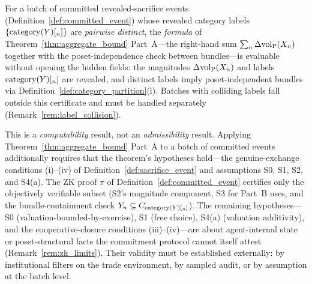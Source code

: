 \begin{proposition}
\label{prop:commit_preserves}
For a batch of committed revealed-sacrifice events
(Definition~\ref{def:committed_event}) whose revealed category
labels $\{\mathrm{category}(Y)[_n]\}$ are \emph{pairwise distinct}, the
\emph{formula} of Theorem~\ref{thm:aggregate_bound} Part~A---the
right-hand sum $\sum_n \Delta{\operatorname{vol}_{\mathrm{P}}}(X_n)$ together with the
poset-independence check between bundles---is evaluable without
opening the hidden fields: the magnitudes $\Delta{\operatorname{vol}_{\mathrm{P}}}(X_n)$ and
labels $\mathrm{category}(Y)[_n]$ are revealed, and distinct labels imply
poset-independent bundles via
Definition~\ref{def:category_partition}(i).  Batches with
colliding labels fall outside this certificate and must be
handled separately (Remark~\ref{rem:label_collision}).

This is a \emph{computability} result, not an
\emph{admissibility} result.  Applying
Theorem~\ref{thm:aggregate_bound} Part~A to a batch of committed
events additionally requires that the theorem's hypotheses
hold---the genuine-exchange conditions (i)--(iv) of
Definition~\ref{def:sacrifice_event} and assumptions S0, S1, S2,
and S4(a).  The ZK proof $\pi$ of
Definition~\ref{def:committed_event} certifies only the
objectively verifiable subset (S2's magnitude component, S3 for
Part~B uses, and the bundle-containment check
$Y_n \subseteq C_{\mathrm{category}(Y)[_n]}$).  The remaining
hypotheses---S0 (valuation-bounded-by-exercise), S1 (free
choice), S4(a) (valuation additivity), and the
cooperative-closure conditions (iii)--(iv)---are about
agent-internal state or poset-structural facts the commitment
protocol cannot itself attest
(Remark~\ref{rem:zk_limits}).  Their validity must be
established externally: by institutional filters on the trade
environment, by sampled audit, or by assumption at the batch
level.
\end{proposition}

